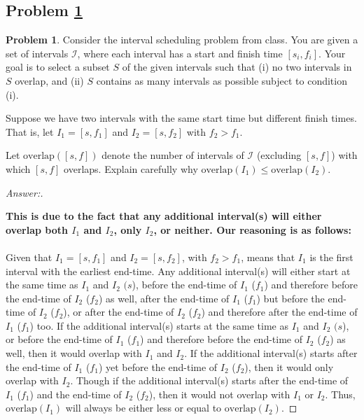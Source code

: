 \documentclass[11pt]{article}
\theoremstyle{definition}
\theoremstyle{definition}
\newtheorem{required}{Problem}
\theoremstyle{definition}
\begin{document}
\subsection{Problem \ref{DFS1}}
\begin{required} \label{DFS1}
Consider the interval scheduling problem from class. You are given a set of intervals $\mathcal{I}$, where each interval has a start and finish time $[s_i, f_i]$. Your goal is to select a subset $S$ of the given intervals such that (i) no two intervals in $S$ overlap, and (ii) $S$ contains as many intervals as possible subject to condition (i). 

Suppose we have two intervals with the same start time but different finish times. That is, let $I_{1} = [s, f_{1}]$ and $I_{2} = [s, f_{2}]$ with $f_{2} > f_{1}$. 
\begin{enumerate}[label=(\alph*)]
\item Let $\text{overlap}([s, f])$ denote the number of intervals of $\mathcal{I}$ (excluding $[s, f]$) with which $[s, f]$ overlaps. Explain carefully why $\text{overlap}(I_{1}) \leq \text{overlap}(I_{2})$.
\begin{proof}[Answer:] \
\item \textbf{This is due to the fact that any additional interval(s) will either overlap both $I_{1}$ and $I_{2}$, only $I_{2}$, or neither. Our reasoning is as follows:} \\ \\
Given that $I_{1} = [s, f_{1}]$ and $I_{2} = [s, f_{2}]$, with $f_{2} > f_{1}$, means that $I_{1}$ is the first interval with the earliest end-time. Any additional interval(s) will either start at the same time as $I_{1}$ and $I_{2}$ $(s$), before the end-time of $I_{1}$ ($f_{1}$) and therefore before the end-time of $I_{2}$ ($f_{2}$) as well, after the end-time of $I_{1}$ ($f_{1}$) but before the end-time of $I_{2}$ ($f_{2}$), or after the end-time of $I_{2}$ ($f_{2}$) and therefore after the end-time of $I_{1}$ ($f_{1}$) too. If the additional interval(s) starts at the same time as $I_{1}$ and $I_{2}$ $(s$), or before the end-time of $I_{1}$ ($f_{1}$) and therefore before the end-time of $I_{2}$ ($f_{2}$) as well, then it would overlap with $I_{1}$ and $I_{2}$. If the additional interval(s) starts after the end-time of $I_{1}$ ($f_{1}$) yet before the end-time of $I_{2}$ ($f_{2}$), then it would only overlap with $I_{2}$. Though if the additional interval(s) starts after the end-time of $I_{1}$ ($f_{1}$) and 
the end-time of $I_{2}$ ($f_{2}$), then it would not overlap with $I_{1}$ or $I_{2}$. Thus, $\text{overlap}(I_{1})$ will always be either less or equal to $\text{overlap}(I_{2})$.
\end{proof}



\end{enumerate}
\end{required}
\end{document}
